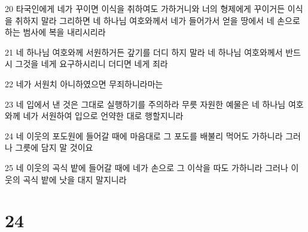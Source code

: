 \par 20 타국인에게 네가 꾸이면 이식을 취하여도 가하거니와 너의 형제에게 꾸이거든 이식을 취하지 말라 그리하면 네 하나님 여호와께서 네가 들어가서 얻을 땅에서 네 손으로 하는 범사에 복을 내리시리라
\par 21 네 하나님 여호와께 서원하거든 갚기를 더디 하지 말라 네 하나님 여호와께서 반드시 그것을 네게 요구하시리니 더디면 네게 죄라
\par 22 네가 서원치 아니하였으면 무죄하니라마는
\par 23 네 입에서 낸 것은 그대로 실행하기를 주의하라 무릇 자원한 예물은 네 하나님 여호와께 네가 서원하여 입으로 언약한 대로 행할지니라
\par 24 네 이웃의 포도원에 들어갈 때에 마음대로 그 포도를 배불리 먹어도 가하니라 그러나 그릇에 담지 말 것이요
\par 25 네 이웃의 곡식 밭에 들어갈 때에 네가 손으로 그 이삭을 따도 가하니라 그러나 이웃의 곡식 밭에 낫을 대지 말지니라

\chapter{24}

